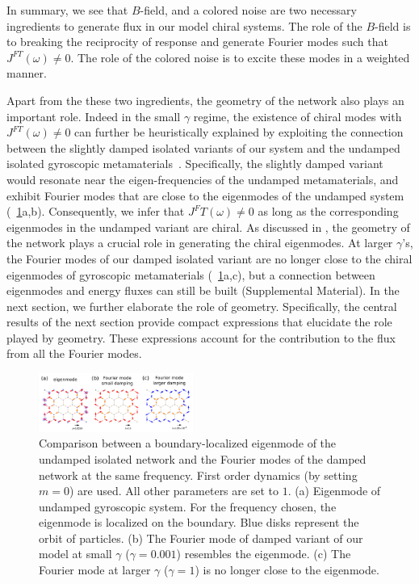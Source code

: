 \documentclass[
 preprint,
 preprintnumbers,
 amsmath,amssymb,
 aps,
 pre,
 longbibliography,
 superscriptaddress,
 10pt, twocolumn
]{revtex4-1}
\begin{document}
In summary, we see that $B$-field, and a colored noise are two necessary ingredients to generate flux in our model chiral systems.
The role of the $B$-field is to breaking the reciprocity of response and generate Fourier modes such that $J^{FT}(\omega)\neq 0$. The role of the colored noise is to excite these modes in a weighted manner.

Apart from the these two ingredients, the geometry of the network also plays an important role.
Indeed in the small $\gamma$ regime, the existence of chiral modes with $J^{FT}(\omega)\neq 0$ can further be heuristically explained by exploiting the connection between the slightly damped isolated variants of our system and the undamped isolated gyroscopic metamaterials~\cite{Nash2015TopologicalMechanics,Mitchell2018AmorphousTopological}.
Specifically, the slightly damped variant would resonate near the eigen-frequencies of the undamped metamaterials, and exhibit Fourier modes that are close to the eigenmodes of the undamped system (\figurename~\ref{fig:Fourier_modes}a,b). Consequently, we infer that $J^FT(\omega)\neq 0$ as long as the corresponding eigenmodes in the undamped variant are chiral. As discussed in  \cite{Nash2015TopologicalMechanics}, the geometry of the network plays a crucial role in generating the chiral eigenmodes.
At larger $\gamma$'s, the Fourier modes of our damped isolated variant are no longer close to the chiral eigenmodes of gyroscopic metamaterials (\figurename~\ref{fig:Fourier_modes}a,c), but a connection between eigenmodes and energy fluxes can still be built (Supplemental Material).
In the next section, we further elaborate the role of geometry. Specifically, the central results of the next section provide compact expressions that elucidate the role played by geometry. These expressions account for the contribution to the flux from all the Fourier modes.

\begin{figure}[ht]
	\centering
	\includegraphics[width=0.45\textwidth]{2_Fourier_modes.pdf}
    \caption{Comparison between a boundary-localized eigenmode of the undamped isolated network and the Fourier modes of the damped network at the same frequency. First order dynamics (by setting $m=0$) are used. All other parameters are set to $1$.
    (a) Eigenmode of undamped gyroscopic system. For the frequency chosen, the eigenmode is localized on the boundary. Blue disks represent the orbit of particles.
    (b) The Fourier mode of damped variant of our model at small $\gamma$ ($\gamma=0.001$) resembles the eigenmode.
    (c) The Fourier mode at larger $\gamma$ ($\gamma=1$) is no longer close to the eigenmode.
    }
    \label{fig:Fourier_modes}
\end{figure}
\end{document}

